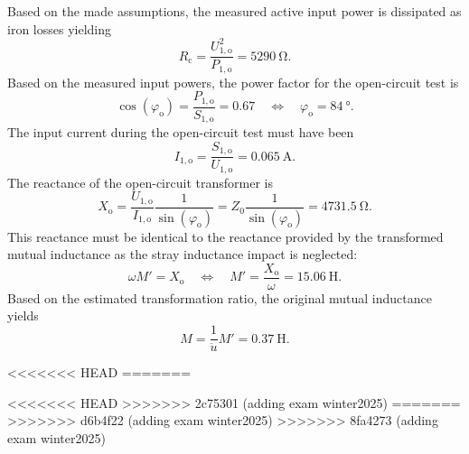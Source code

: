 
\begin{solutionblock}
	Based on the made assumptions, the measured active input power is dissipated as iron losses yielding
	$$
		R_\mathrm{c} = \frac{U^2_{1,\mathrm{o}}}{P_{1,\mathrm{o}}} = \SI{5290}{\ohm}.
	$$
	Based on the measured input powers, the power factor for the open-circuit test is
	$$
		\cos(\varphi_\mathrm{o}) = \frac{P_{1,\mathrm{o}}}{S_{1,\mathrm{o}}} = 0.67 \quad \Leftrightarrow \quad \varphi_\mathrm{o} = \SI{84}{\degree}.
	$$
	The input current during the open-circuit test must have been
	$$
		I_{1,\mathrm{o}} = \frac{S_{1,\mathrm{o}}}{U_{1,\mathrm{o}}} = \SI{0.065}{\ampere}.
	$$
	The reactance of the open-circuit transformer is
	$$
		X_\mathrm{o} = \frac{U_{1,\mathrm{o}}}{I_{1,\mathrm{o}}}\frac{1}{\sin(\varphi_\mathrm{o})} = Z_\mathrm{0} \frac{1}{\sin(\varphi_\mathrm{o})} = \SI{4731.5}{\ohm}.
	$$
	This reactance must be identical to the reactance provided by the transformed mutual inductance as the stray inductance impact is neglected:
	$$
		\omega M' = X_\mathrm{o} \quad \Leftrightarrow \quad M' =\frac{X_\mathrm{o}}{\omega} = \SI{15.06}{\henry}.
	$$
	Based on the estimated transformation ratio, the original mutual inductance yields
	$$
		M = \frac{1}{\ddot{u}}M' = \SI{0.37}{\henry}.
	$$
\end{solutionblock}

<<<<<<< HEAD
=======



<<<<<<< HEAD
>>>>>>> 2c75301 (adding exam winter2025)
=======
>>>>>>> d6b4f22 (adding exam winter2025)
>>>>>>> 8fa4273 (adding exam winter2025)


